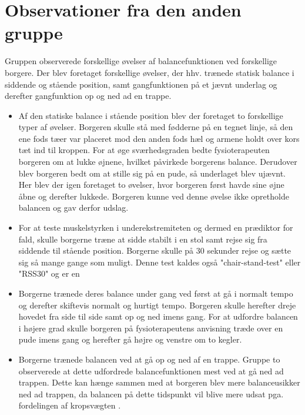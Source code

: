 \section{Observationer fra  den anden gruppe}
Gruppen observerede forskellige øvelser af balancefunktionen ved forskellige borgere. Der blev foretaget forskellige øvelser, der hhv. trænede statisk balance i siddende og stående position, samt gangfunktionen på et jævnt underlag og derefter gangfunktion op og ned ad en trappe. 
\begin{itemize}
\item Af den statiske balance i stående position blev der foretaget to forskellige typer af øvelser. Borgeren skulle stå med fødderne på en tegnet linje, så den ene fods tæer var placeret mod den anden fods hæl og armene holdt over kors tæt ind til kroppen. For at øge sværhedsgraden bedte fysioterapeuten borgeren om at lukke øjnene, hvilket påvirkede borgerens balance. Derudover blev borgeren bedt om at stille sig på en pude, så underlaget blev ujævnt. Her blev der igen foretaget to øvelser, hvor borgeren først havde sine øjne åbne og derefter lukkede. Borgeren kunne ved denne øvelse ikke opretholde balancen og gav derfor udslag. 
\item For at teste muskelstyrken i underekstremiteten og dermed en prædiktor for fald, skulle borgerne træne at sidde stabilt i en stol samt rejse sig fra siddende til stående position. Borgerne skulle på $30$ sekunder rejse og sætte sig så mange gange som muligt. Denne test kaldes også "chair-stand-test" eller "RSS30" og er en 
\item Borgerne trænede deres balance under gang ved først at gå i normalt tempo og derefter skiftevis normalt og hurtigt tempo. Borgeren skulle herefter dreje hovedet fra side til side samt op og ned imens gang. For at udfordre balancen i højere grad skulle borgeren på fysioterapeutens anvisning træde over en pude imens gang og herefter gå højre og venstre om to kegler.
\item Borgerne trænede balancen ved at gå op og ned af en trappe. Gruppe to observerede at dette udfordrede balancefunktionen mest ved at gå ned ad trappen. Dette kan hænge sammen med at borgeren blev mere balanceusikker ned ad trappen, da balancen på dette tidspunkt vil blive mere udsat pga. fordelingen af kropsvægten . 
\end{itemize} 